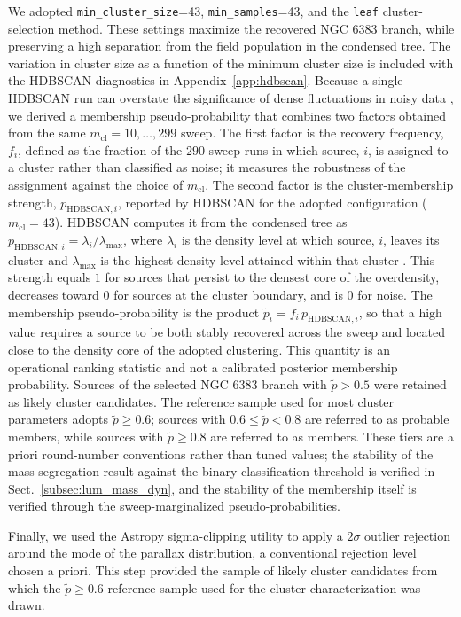 \documentclass{aa}
\begin{document}
We adopted \texttt{min\_cluster\_size}=43, \texttt{min\_samples}=43, and the \texttt{leaf} cluster-selection method. These settings maximize the recovered NGC 6383 branch, while preserving a high separation from the field population in the condensed tree. The variation in cluster size as a function of the minimum cluster size is included with the HDBSCAN diagnostics in Appendix~\ref{app:hdbscan}. Because a single HDBSCAN run can overstate the significance of dense fluctuations in noisy data \citep{2021A&A...646A.104H}, we derived a membership pseudo-probability that combines two factors obtained from the same $m_{\mathrm{cl}}=10,\ldots,299$ sweep. The first factor is the recovery frequency, $f_i$, defined as the fraction of the $290$ sweep runs in which source, $i$, is assigned to a cluster rather than classified as noise; it measures the robustness of the assignment against the choice of $m_{\mathrm{cl}}$. The second factor is the cluster-membership strength, $p_{\mathrm{HDBSCAN},i}$, reported by HDBSCAN for the adopted configuration ($m_{\mathrm{cl}}=43$). HDBSCAN computes it from the condensed tree as $p_{\mathrm{HDBSCAN},i}=\lambda_i/\lambda_{\mathrm{max}}$, where $\lambda_i$ is the density level at which source, $i$, leaves its cluster and $\lambda_{\mathrm{max}}$ is the highest density level attained within that cluster \citep{McInnes2017}. This strength equals $1$ for sources that persist to the densest core of the overdensity, decreases toward $0$ for sources at the cluster boundary, and is $0$ for noise. The membership pseudo-probability is the product $\tilde{p}_i=f_i\,p_{\mathrm{HDBSCAN},i}$, so that a high value requires a source to be both stably recovered across the sweep and located close to the density core of the adopted clustering. This quantity is an operational ranking statistic and not a calibrated posterior membership probability. Sources of the selected NGC 6383 branch with $\tilde{p}>0.5$ were retained as likely cluster candidates. The reference sample used for most cluster parameters adopts $\tilde{p}\geq0.6$; sources with $0.6\leq\tilde{p}<0.8$ are referred to as probable members, while sources with $\tilde{p}\geq0.8$ are referred to as members. These tiers are a priori round-number conventions rather than tuned values; the stability of the mass-segregation result against the binary-classification threshold is verified in Sect.~\ref{subsec:lum_mass_dyn}, and the stability of the membership itself is verified through the sweep-marginalized pseudo-probabilities.

Finally, we used the Astropy sigma-clipping \citep{astropy:2013,astropy:2018,astropy:2022} utility to apply a $2\sigma$ outlier rejection around the mode of the parallax distribution, a conventional rejection level chosen a priori. This step provided the sample of likely cluster candidates from which the $\tilde{p}\geq0.6$ reference sample used for the cluster characterization was drawn.
\end{document}
